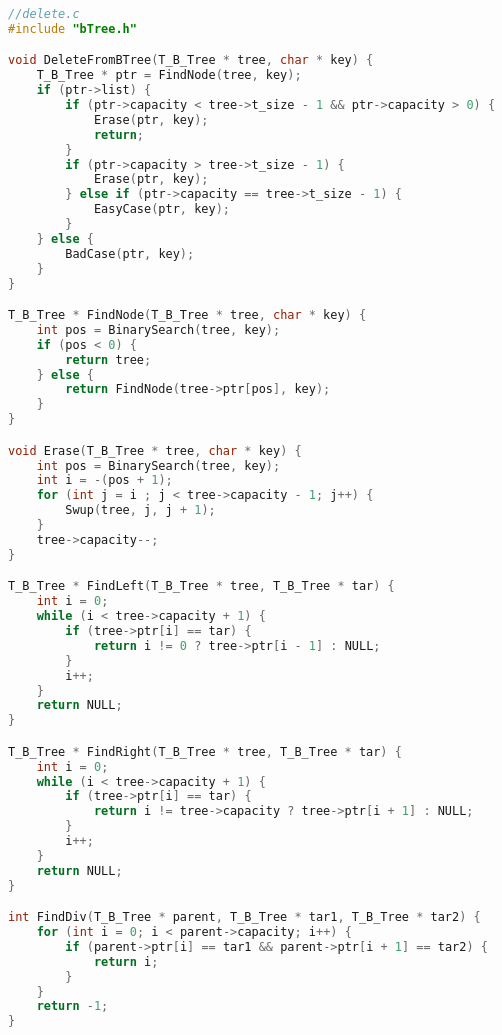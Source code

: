 \begin{lstlisting}[language=C]
//delete.c
#include "bTree.h"

void DeleteFromBTree(T_B_Tree * tree, char * key) {
    T_B_Tree * ptr = FindNode(tree, key);
    if (ptr->list) {
        if (ptr->capacity < tree->t_size - 1 && ptr->capacity > 0) {
            Erase(ptr, key);
            return;
        }
        if (ptr->capacity > tree->t_size - 1) {
            Erase(ptr, key);
        } else if (ptr->capacity == tree->t_size - 1) {
            EasyCase(ptr, key);
        }
    } else {
        BadCase(ptr, key);
    }
}

T_B_Tree * FindNode(T_B_Tree * tree, char * key) {
    int pos = BinarySearch(tree, key);
    if (pos < 0) {
        return tree;
    } else {
        return FindNode(tree->ptr[pos], key);
    }
}

void Erase(T_B_Tree * tree, char * key) {
    int pos = BinarySearch(tree, key);
    int i = -(pos + 1);
    for (int j = i ; j < tree->capacity - 1; j++) {
        Swup(tree, j, j + 1);
    }
    tree->capacity--;
}

T_B_Tree * FindLeft(T_B_Tree * tree, T_B_Tree * tar) {
    int i = 0;
    while (i < tree->capacity + 1) {
        if (tree->ptr[i] == tar) {
            return i != 0 ? tree->ptr[i - 1] : NULL;
        }
        i++;
    }
    return NULL;
}

T_B_Tree * FindRight(T_B_Tree * tree, T_B_Tree * tar) {
    int i = 0;
    while (i < tree->capacity + 1) {
        if (tree->ptr[i] == tar) {
            return i != tree->capacity ? tree->ptr[i + 1] : NULL;
        }
        i++;
    }
    return NULL;
}

int FindDiv(T_B_Tree * parent, T_B_Tree * tar1, T_B_Tree * tar2) {
    for (int i = 0; i < parent->capacity; i++) {
        if (parent->ptr[i] == tar1 && parent->ptr[i + 1] == tar2) {
            return i;
        }
    }
    return -1;
}


\end{lstlisting}
